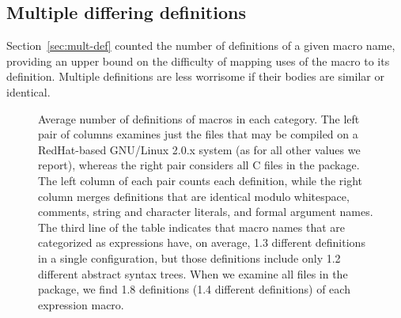 \documentclass[10pt]{article}
\newcommand{\captionsmall}[1]{\caption[]{\small #1}}
\begin{document}
        
\subsection{Multiple differing definitions}
\label{sec:mult-diff-def}

Section~\ref{sec:mult-def} counted the number of definitions of a given
macro name, providing an upper bound on the difficulty of
mapping uses of the macro to its definition.  Multiple definitions are less worrisome if
their bodies are similar or identical.

        
%   

\begin{figure}
  {\small\centerline{}}
  \captionsmall{Average number of definitions of macros in each category.
    The left pair of columns examines just the files that may be compiled
    on a RedHat-based GNU/Linux 2.0.x system (as for all other values we
    report), whereas the right pair considers all C files in the package.
    The left column of each pair counts each definition, while the right
    column merges definitions that are identical modulo whitespace,
    comments, string and character literals, and formal argument names.
    The third line of the table indicates that macro names that are
    categorized as expressions have, on average, 1.3 different definitions
    in a single configuration, but those definitions include only 1.2
    different abstract syntax trees.  When we examine all files in the
    package, we find 1.8 definitions (1.4 different
    definitions) of each expression macro.}
  \label{fig:freq-sum-cat}
\end{figure}
\end{document}
